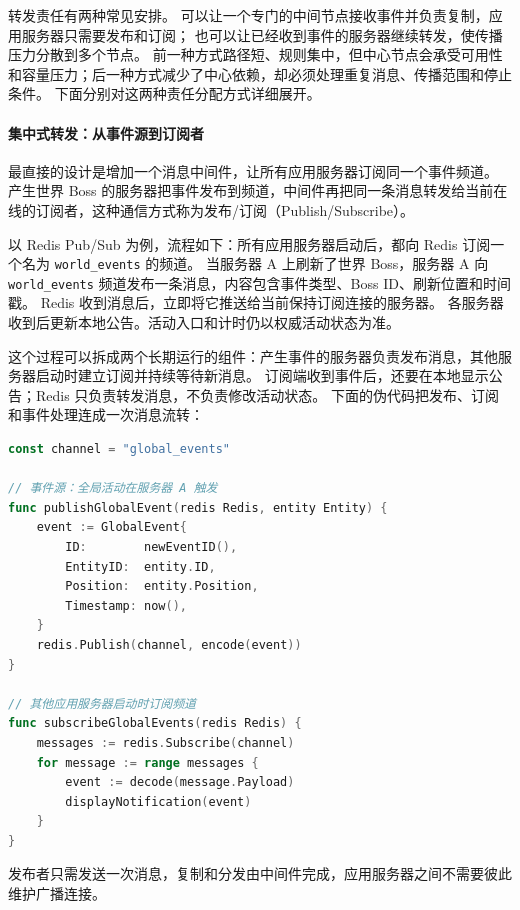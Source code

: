 转发责任有两种常见安排。
可以让一个专门的中间节点接收事件并负责复制，应用服务器只需要发布和订阅；
也可以让已经收到事件的服务器继续转发，使传播压力分散到多个节点。
前一种方式路径短、规则集中，但中心节点会承受可用性和容量压力；后一种方式减少了中心依赖，却必须处理重复消息、传播范围和停止条件。
下面分别对这两种责任分配方式详细展开。

\paragraph{集中式转发：从事件源到订阅者}

最直接的设计是增加一个消息中间件，让所有应用服务器订阅同一个事件频道。
产生世界 Boss 的服务器把事件发布到频道，中间件再把同一条消息转发给当前在线的订阅者，这种通信方式称为发布/订阅（Publish/Subscribe）。

以 Redis Pub/Sub 为例，流程如下：所有应用服务器启动后，都向 Redis 订阅一个名为 \texttt{world\_events} 的频道。
当服务器 A 上刷新了世界 Boss，服务器 A 向 \texttt{world\_events} 频道发布一条消息，内容包含事件类型、Boss ID、刷新位置和时间戳。
Redis 收到消息后，立即将它推送给当前保持订阅连接的服务器。
各服务器收到后更新本地公告。活动入口和计时仍以权威活动状态为准。

这个过程可以拆成两个长期运行的组件：产生事件的服务器负责发布消息，其他服务器启动时建立订阅并持续等待新消息。
订阅端收到事件后，还要在本地显示公告；Redis 只负责转发消息，不负责修改活动状态。
下面的伪代码把发布、订阅和事件处理连成一次消息流转：

\begin{tcolorbox}[title=Redis Pub/Sub 的发布与订阅流程]
\begin{lstlisting}[style=codeblock, language=go]
const channel = "global_events"

// 事件源：全局活动在服务器 A 触发
func publishGlobalEvent(redis Redis, entity Entity) {
    event := GlobalEvent{
        ID:        newEventID(),
        EntityID:  entity.ID,
        Position:  entity.Position,
        Timestamp: now(),
    }
    redis.Publish(channel, encode(event))
}

// 其他应用服务器启动时订阅频道
func subscribeGlobalEvents(redis Redis) {
    messages := redis.Subscribe(channel)
    for message := range messages {
        event := decode(message.Payload)
        displayNotification(event)
    }
}
\end{lstlisting}
\end{tcolorbox}

发布者只需发送一次消息，复制和分发由中间件完成，应用服务器之间不需要彼此维护广播连接。

